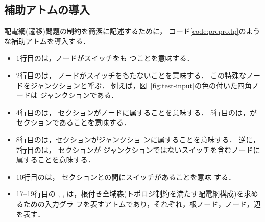 \subsection{補助アトムの導入}\label{chap:prepro}



配電網(遷移)問題の制約を簡潔に記述するために，
コード\ref{code:prepro.lp}のような補助アトムを導入する．
\begin{itemize}
\item 1行目のは，ノードがスイッチをも
  つことを意味する．
\item 2行目のは，
  ノードがスイッチをもたないことを意味する．
  この特殊なノードをジャンクションと呼ぶ．
  例えば，図~\ref{fig:test-input}の色の付いた四角ノードは
  ジャンクションである．
\item 4行目のは，
  セクションがノードに属することを意味する．
  5行目のは，がセクションであることを意味する．
\item 8行目のは，セクションがジャンクショ
  ンに属することを意味する．
  逆に，7行目のは，
  セクションが
  ジャンクションではないスイッチを含むノードに属することを意味する．
\item 10行目のは，
  セクションとの間にスイッチがあることを意味
  する．
\item 17--19行目の
,
,
は，根付き全域森(トポロジ制約を満たす配電網構成)を求めるための入力グラ
フを表すアトムであり，それぞれ，根ノード，ノード，辺を表す．


\end{itemize}
